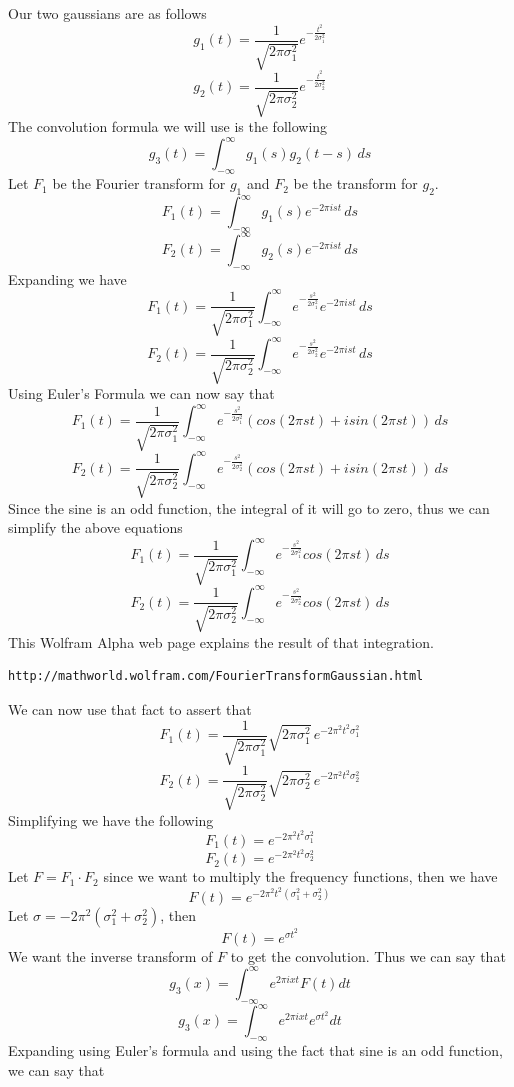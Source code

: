 \documentclass[11pt,psfig]{article}
\begin{document}
Our two gaussians are as follows
\[
g_1(t) = \frac{1}{\sqrt{2\pi \sigma_1^2}} e^{-\frac{t^2}{2\sigma_1^2}}
\]
\[
g_2(t) = \frac{1}{\sqrt{2\pi \sigma_2^2}} e^{-\frac{t^2}{2\sigma_2^2}}
\]
The convolution formula we will use is the following
\[
g_3(t) = \int_{-\infty}^{\infty}{g_1(s)g_2(t-s) \, ds}
\]
Let $F_1$ be the Fourier transform for $g_1$ and $F_2$ be the transform for $g_2$.\\
\[
F_1(t) = \int_{-\infty}^{\infty}{g_1(s) e^{-2\pi i s t} \, ds}
\]
\[
F_2(t) = \int_{-\infty}^{\infty}{g_2(s) e^{-2\pi i s t} \, ds}
\]
Expanding we have
\[
F_1(t) = \frac{1}{\sqrt{2 \pi \sigma_1^2}} \int_{-\infty}^{\infty}{e^{-\frac{s^2}{2\sigma_1^2}} e^{-2\pi i s t} \, ds}
\]
\[
F_2(t) = \frac{1}{\sqrt{2 \pi \sigma_2^2}} \int_{-\infty}^{\infty}{e^{-\frac{s^2}{2\sigma_2^2}} e^{-2\pi i s t} \, ds}
\]
Using Euler's Formula we can now say that
\[
F_1(t) = \frac{1}{\sqrt{2 \pi \sigma_1^2}} \int_{-\infty}^{\infty}{e^{-\frac{s^2}{2\sigma_1^2}} (cos(2\pi s t) + i sin(2\pi s t)) \, ds}
\]
\[
F_2(t) = \frac{1}{\sqrt{2 \pi \sigma_2^2}} \int_{-\infty}^{\infty}{e^{-\frac{s^2}{2\sigma_2^2}} (cos(2\pi s t) + i sin(2\pi s t)) \, ds}
\]
Since the sine is an odd function, the integral of it will go to zero, thus we can simplify the above equations
\[
F_1(t) = \frac{1}{\sqrt{2 \pi \sigma_1^2}} \int_{-\infty}^{\infty}{e^{-\frac{s^2}{2\sigma_1^2}} cos(2\pi s t) \, ds}
\]
\[
F_2(t) = \frac{1}{\sqrt{2 \pi \sigma_2^2}} \int_{-\infty}^{\infty}{e^{-\frac{s^2}{2\sigma_2^2}} cos(2\pi s t) \, ds}
\]
This Wolfram Alpha web page explains the result of that integration. 
\begin{verbatim}
http://mathworld.wolfram.com/FourierTransformGaussian.html
\end{verbatim}
We can now use that fact to assert that
\[
F_1(t) = \frac{1}{\sqrt{2 \pi \sigma_1^2}} \sqrt{2 \pi \sigma_1^2} \, e^{-2 \pi^2 t^2 \sigma_1^2}
\]
\[
F_2(t) = \frac{1}{\sqrt{2 \pi \sigma_2^2}} \sqrt{2 \pi \sigma_2^2} \, e^{-2 \pi^2 t^2 \sigma_2^2}
\]
Simplifying we have the following
\[
F_1(t) = e^{-2 \pi^2 t^2 \sigma_1^2}
\]
\[
F_2(t) = e^{-2 \pi^2 t^2 \sigma_2^2}
\]
Let $F=F_1 \cdot F_2$ since we want to multiply the frequency functions, then we have
\[
F(t) = e^{-2 \pi^2 t^2 (\sigma_1^2 + \sigma_2^2)}
\]
Let $\sigma = -2 \pi^2 (\sigma_1^2 + \sigma_2^2)$, then 
\[
F(t) = e^{\sigma t^2}
\]
We want the inverse transform of $F$ to get the convolution. Thus we can say that 
\[
g_3(x) = \int_{-\infty}^{\infty} e^{2\pi i x t} F(t) dt
\]
\[
g_3(x) = \int_{-\infty}^{\infty} e^{2\pi i x t}e^{\sigma t^2} dt
\]
Expanding using Euler's formula and using the fact that sine is an odd function, we can say that
\end{document}
